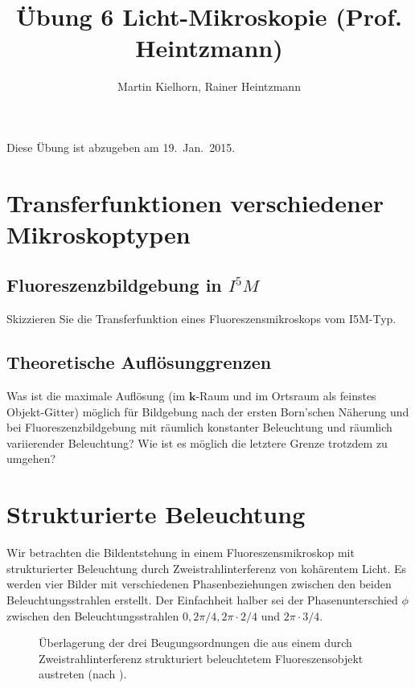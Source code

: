 \documentclass{article}
\begin{document}
\author{Martin Kielhorn, Rainer Heintzmann}
\title{\"Ubung 6 Licht-Mikroskopie (Prof. Heintzmann)}
\maketitle
\noindent Diese \"Ubung ist abzugeben am 19.~Jan.~2015.

\section{Transferfunktionen verschiedener Mikroskoptypen}
\subsection*{Fluoreszenzbildgebung in $I^5M$}
Skizzieren Sie die Transferfunktion eines Fluoreszensmikroskops vom I5M-Typ.

\subsection*{Theoretische Aufl\"osunggrenzen}

Was ist die maximale Aufl\"osung (im $\mathbf{k}$-Raum und im Ortsraum
als feinstes Objekt-Gitter) m\"oglich f\"ur Bildgebung nach der ersten
Born'schen N\"aherung und bei Fluoreszenzbildgebung mit r\"aumlich
konstanter Beleuchtung und r\"aumlich variierender Beleuchtung? Wie ist
es m\"oglich die letztere Grenze trotzdem zu umgehen?


\section{Strukturierte Beleuchtung}

Wir betrachten die Bildentstehung in einem Fluoreszensmikroskop mit
strukturierter Beleuchtung durch Zweistrahlinterferenz von
koh\"arentem Licht. Es werden vier Bilder mit verschiedenen
Phasenbeziehungen zwischen den beiden Beleuchtungsstrahlen
erstellt. Der Einfachheit halber sei der Phasenunterschied $\phi$
zwischen den Beleuchtungsstrahlen $0, 2\pi/4, 2\pi\cdot 2/4$ und
$2\pi\cdot 3/4$.


\begin{figure}[htbp]
  \centering
  
  \caption{\"Uberlagerung der drei Beugungsordnungen die aus einem
    durch Zweistrahlinterferenz strukturiert beleuchtetem
    Fluoreszensobjekt austreten (nach
    \cite{heintzmann1999laterally}).}
  \label{fig:sim-mixing}
\end{figure}
\end{document}
